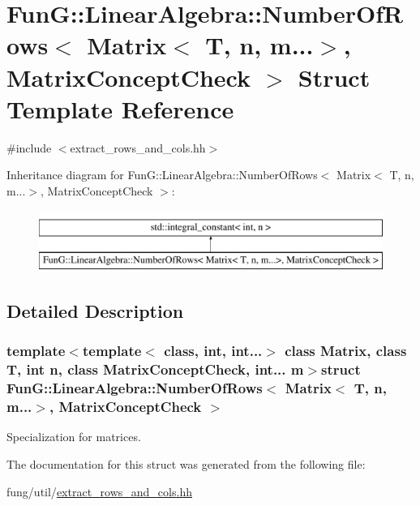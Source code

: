 \hypertarget{structFunG_1_1LinearAlgebra_1_1NumberOfRows_3_01Matrix_3_01T_00_01n_00_01m_8_8_8_4_00_01MatrixConceptCheck_01_4}{\section{\-Fun\-G\-:\-:\-Linear\-Algebra\-:\-:\-Number\-Of\-Rows$<$ \-Matrix$<$ \-T, n, m...$>$, \-Matrix\-Concept\-Check $>$ \-Struct \-Template \-Reference}
\label{structFunG_1_1LinearAlgebra_1_1NumberOfRows_3_01Matrix_3_01T_00_01n_00_01m_8_8_8_4_00_01MatrixConceptCheck_01_4}
}


{\ttfamily \#include $<$extract\-\_\-rows\-\_\-and\-\_\-cols.\-hh$>$}

\-Inheritance diagram for \-Fun\-G\-:\-:\-Linear\-Algebra\-:\-:\-Number\-Of\-Rows$<$ \-Matrix$<$ \-T, n, m...$>$, \-Matrix\-Concept\-Check $>$\-:\begin{figure}[H]
\begin{center}
\leavevmode
\includegraphics[height=2.000000cm]{structFunG_1_1LinearAlgebra_1_1NumberOfRows_3_01Matrix_3_01T_00_01n_00_01m_8_8_8_4_00_01MatrixConceptCheck_01_4}
\end{center}
\end{figure}


\subsection{\-Detailed \-Description}
\subsubsection*{template$<$template$<$ class, int, int...$>$ class \-Matrix, class T, int n, class Matrix\-Concept\-Check, int... m$>$struct Fun\-G\-::\-Linear\-Algebra\-::\-Number\-Of\-Rows$<$ Matrix$<$ T, n, m...$>$, Matrix\-Concept\-Check $>$}

\-Specialization for matrices. 

\-The documentation for this struct was generated from the following file\-:\begin{DoxyCompactItemize}
\item 
fung/util/\hyperlink{extract__rows__and__cols_8hh}{extract\-\_\-rows\-\_\-and\-\_\-cols.\-hh}\end{DoxyCompactItemize}
